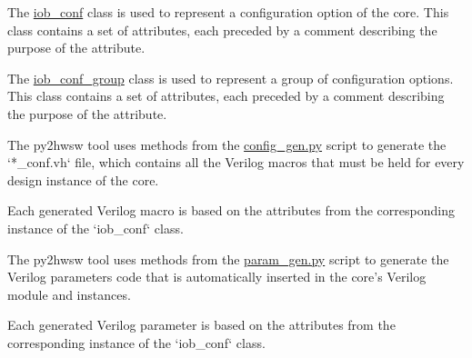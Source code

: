 %

%
%

The \href{https://github.com/IObundle/py2hwsw/blob/main/py2hwsw/scripts/iob_conf.py}{iob\_conf} class is used to represent a configuration option of the core.
This class contains a set of attributes, each preceded by a comment describing the purpose of the attribute.



The \href{https://github.com/IObundle/py2hwsw/blob/main/py2hwsw/scripts/iob_conf.py}{iob\_conf\_group} class is used to represent a group of configuration options.
This class contains a set of attributes, each preceded by a comment describing the purpose of the attribute.


%
%

The py2hwsw tool uses methods from the \href{https://github.com/IObundle/py2hwsw/blob/main/py2hwsw/scripts/config_gen.py}{config\_gen.py} script to generate the `*\_conf.vh` file, which contains all the Verilog macros that must be held for every design instance of the core.

Each generated Verilog macro is based on the attributes from the corresponding instance of the `iob\_conf` class.



The py2hwsw tool uses methods from the \href{https://github.com/IObundle/py2hwsw/blob/main/py2hwsw/scripts/param_gen.py}{param\_gen.py} script to generate the Verilog parameters code that is automatically inserted in the core's Verilog module and instances.

Each generated Verilog parameter is based on the attributes from the corresponding instance of the `iob\_conf` class.

